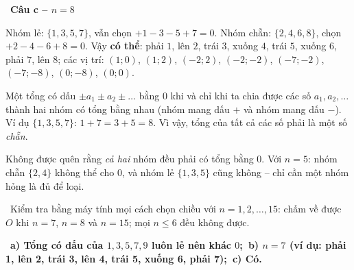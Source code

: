 \documentclass[11pt]{article}
\providecommand{\AnsWord}{Đáp số}
\newcommand{\ans}[1]{\par\smallskip{\bfseries\color{tmGreen!88!black}\AnsWord:}\ {\bfseries\color{AnsRed}#1}\par}
\newcommand{\step}[2]{\par\smallskip\noindent{\bfseries\color{tmBlue!85!black}\StepWord~#1.}\ {\bfseries #2}\par\nopagebreak}
\newcommand{\verify}[1]{\par\smallskip\noindent{\bfseries\color{tmGreen!80!black}\faCheckCircle\ \CheckWord}\ #1\par}
\def\AnsWord{Đáp số}
\def\StepWord{Bước}
\def\CheckWord{Thử lại:}
\begin{document}
{\step{4}{Câu c -- $n=8$}
Nhóm lẻ: $\{1,3,5,7\}$, vẫn chọn $+1-3-5+7=0$. Nhóm chẵn: $\{2,4,6,8\}$, chọn $+2-4-6+8=0$. Vậy \textbf{có thể}: phải $1$, lên $2$, trái $3$, xuống $4$, trái $5$, xuống $6$, phải $7$, lên $8$; các vị trí: $(1;0)$, $(1;2)$, $(-2;2)$, $(-2;-2)$, $(-7;-2)$, $(-7;-8)$, $(0;-8)$, $(0;0)$.
\begin{proofbox}Một tổng có dấu $\pm a_1\pm a_2\pm\dots$ bằng $0$ khi và chỉ khi ta chia được các số $a_1,a_2,\dots$ thành hai nhóm có tổng bằng nhau (nhóm mang dấu $+$ và nhóm mang dấu $-$). Ví dụ $\{1,3,5,7\}$: $1+7=3+5=8$. Vì vậy, tổng của tất cả các số phải là một số \emph{chẵn}.\end{proofbox}
\begin{warnbox}Không được quên rằng \emph{cả hai} nhóm đều phải có tổng bằng $0$. Với $n=5$: nhóm chẵn $\{2,4\}$ không thể cho $0$, và nhóm lẻ $\{1,3,5\}$ cũng không -- chỉ cần một nhóm hỏng là đủ để loại.\end{warnbox}
\verify{Kiểm tra bằng máy tính mọi cách chọn chiều với $n=1,2,\dots,15$: chấm về được $O$ khi $n=7$, $n=8$ và $n=15$; mọi $n\le 6$ đều không được.}
\ans{a) Tổng có dấu của $1,3,5,7,9$ luôn lẻ nên khác $0$;\ b) $n=7$ (ví dụ: phải 1, lên 2, trái 3, lên 4, trái 5, xuống 6, phải 7);\ c) Có.}
}
\end{document}
